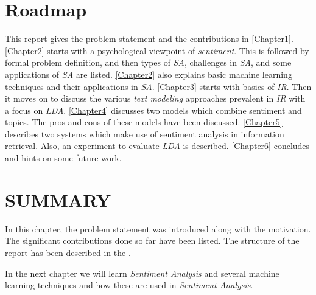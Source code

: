 
\section{Roadmap}\label{sec:roadmap}
\par
This report gives the problem statement and the contributions in \cref{Chapter1}. \cref{Chapter2} starts with a psychological viewpoint of \textit{sentiment}. 
This is followed by formal problem definition, and then types of \textit{SA}, challenges in \textit{SA}, and some applications of \textit{SA} are
listed. \cref{Chapter2} also explains basic machine learning techniques and their applications in \textit{SA}. \cref{Chapter3} starts
with basics of \textit{IR}. Then it moves on to discuss the various \textit{text modeling} approaches prevalent in \textit{IR} with a focus
on \textit{LDA}. \cref{Chapter4} discusses two models which combine sentiment and topics. The pros and cons of these models have been discussed. 
\cref{Chapter5} describes two systems which make use of sentiment analysis in information retrieval. Also, an experiment to evaluate \textit{LDA}
is described. \cref{Chapter6} concludes and hints on some future work.

\section*{SUMMARY}

In this chapter, the problem statement was introduced along with the motivation. The significant contributions done so far have been listed.
The structure of the report has been described in the .

In the next chapter we will learn \textit{Sentiment Analysis} and several machine learning techniques and how these are used in \textit{Sentiment Analysis}.

\clearpage

